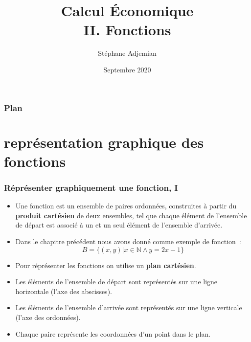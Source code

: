 \documentclass[10pt,notheorems]{beamer}
\theoremstyle{plain}
\theoremstyle{definition} %
\begin{document}
\title{Calcul Économique\\\small{II. Fonctions}}
\author[S. Adjemian]{Stéphane Adjemian}
 \date{Septembre 2020}

\begin{frame}
  \titlepage{}
\end{frame}

\begin{frame}
  \frametitle{Plan}
  \tableofcontents
\end{frame}


\section{représentation graphique des fonctions}

\begin{frame}
  \frametitle{Réprésenter graphiquement une fonction, I}
  \hypertarget{slide_plan_cartesien_1}{}

  \begin{itemize}

  \item Une fonction est un ensemble de paires ordonnées, construites
    à partir du \textbf{produit cartésien} de deux ensembles, tel que chaque
    élément de l'ensemble de départ est associé à un et un seul
    élément de l'ensemble d'arrivée.\newline

  \item Dans le chapitre précédent nous avons donné comme exemple de fonction~:
    \[
      B = \{(x,y) | x\in\mathbb N \land y = 2x-1\}
    \]

  \item Pour réprésenter les fonctions on utilise un \textbf{plan cartésien}.\newline

  \item Les éléments de l'ensemble de départ sont représentés sur une ligne horizontale (l'axe des abscisses).\newline

  \item Les éléments de l'ensemble d'arrivée sont représentés sur une ligne verticale (l'axe des ordonnées).\newline

  \item Chaque paire représente les coordonnées d'un point dans le plan.

  \end{itemize}

\end{frame}
\end{document}
